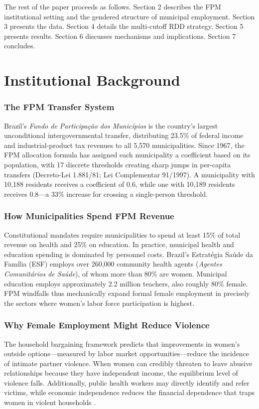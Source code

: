 \documentclass[12pt]{article}
\begin{document}
The rest of the paper proceeds as follows. Section 2 describes the FPM institutional setting and the gendered structure of municipal employment. Section 3 presents the data. Section 4 details the multi-cutoff RDD strategy. Section 5 presents results. Section 6 discusses mechanisms and implications. Section 7 concludes.

\section{Institutional Background}

\subsubsection*{The FPM Transfer System} Brazil's \textit{Fundo de Participa\c{c}\~{a}o dos Munic\'{i}pios} is the country's largest unconditional intergovernmental transfer, distributing 23.5\% of federal income and industrial-product tax revenues to all 5,570 municipalities. Since 1967, the FPM allocation formula has assigned each municipality a coefficient based on its population, with 17 discrete thresholds creating sharp jumps in per-capita transfers (Decreto-Lei 1.881/81; Lei Complementar 91/1997). A municipality with 10,188 residents receives a coefficient of 0.6, while one with 10,189 residents receives 0.8---a 33\% increase for crossing a single-person threshold.

\subsubsection*{How Municipalities Spend FPM Revenue} Constitutional mandates require municipalities to spend at least 15\% of total revenue on health and 25\% on education. In practice, municipal health and education spending is dominated by personnel costs. Brazil's Estrat\'{e}gia Sa\'{u}de da Fam\'{i}lia (ESF) employs over 260,000 community health agents (\textit{Agentes Comunit\'{a}rios de Sa\'{u}de}), of whom more than 80\% are women. Municipal education employs approximately 2.2 million teachers, also roughly 80\% female. FPM windfalls thus mechanically expand formal female employment in precisely the sectors where women's labor force participation is highest.

\subsubsection*{Why Female Employment Might Reduce Violence} The household bargaining framework \citep{stevenson2006bargaining, aizer2010wages} predicts that improvements in women's outside options---measured by labor market opportunities---reduce the incidence of intimate partner violence. When women can credibly threaten to leave abusive relationships because they have independent income, the equilibrium level of violence falls. Additionally, public health workers may directly identify and refer victims, while economic independence reduces the financial dependence that traps women in violent households \citep{farmer2011intimate}.
\end{document}
